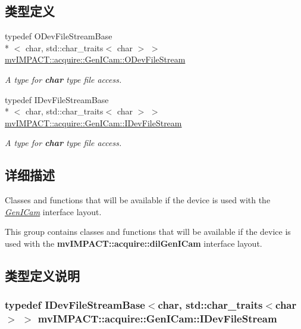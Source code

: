\subsection*{类型定义}
\begin{DoxyCompactItemize}
\item 
typedef O\+Dev\+File\+Stream\+Base\\*
$<$ char, std\+::char\+\_\+traits$<$ char $>$ $>$ \hyperlink{group___gen_i_cam_interface_file_stream_ga7d9df27b854d193a06556bda6f1a9488}{mv\+I\+M\+P\+A\+C\+T\+::acquire\+::\+Gen\+I\+Cam\+::\+O\+Dev\+File\+Stream}
\begin{DoxyCompactList}\small\item\em A type for {\bfseries char} type file access. \end{DoxyCompactList}\item 
typedef I\+Dev\+File\+Stream\+Base\\*
$<$ char, std\+::char\+\_\+traits$<$ char $>$ $>$ \hyperlink{group___gen_i_cam_interface_file_stream_ga35f546ea58f515c24771b20132efacbc}{mv\+I\+M\+P\+A\+C\+T\+::acquire\+::\+Gen\+I\+Cam\+::\+I\+Dev\+File\+Stream}
\begin{DoxyCompactList}\small\item\em A type for {\bfseries char} type file access. \end{DoxyCompactList}\end{DoxyCompactItemize}


\subsection{详细描述}
Classes and functions that will be available if the device is used with the {\itshape \hyperlink{namespacemv_i_m_p_a_c_t_1_1acquire_1_1_gen_i_cam}{Gen\+I\+Cam}} interface layout. 

This group contains classes and functions that will be available if the device is used with the {\bfseries mv\+I\+M\+P\+A\+C\+T\+::acquire\+::dil\+Gen\+I\+Cam} interface layout. 

\subsection{类型定义说明}
\hypertarget{group___gen_i_cam_interface_file_stream_ga35f546ea58f515c24771b20132efacbc}{
\subsubsection[{I\+Dev\+File\+Stream}]{\setlength{\rightskip}{0pt plus 5cm}typedef I\+Dev\+File\+Stream\+Base$<$char, std\+::char\+\_\+traits$<$char$>$ $>$ {\bf mv\+I\+M\+P\+A\+C\+T\+::acquire\+::\+Gen\+I\+Cam\+::\+I\+Dev\+File\+Stream}}}\label{group___gen_i_cam_interface_file_stream_ga35f546ea58f515c24771b20132efacbc}


